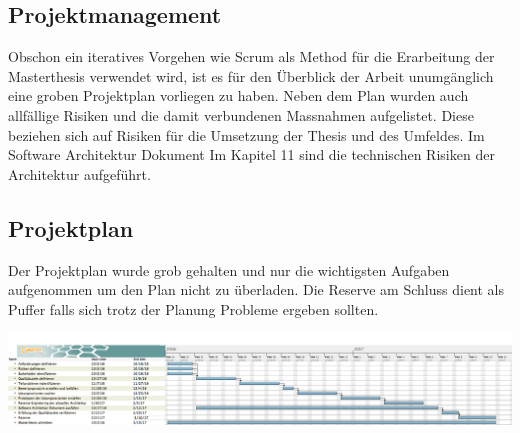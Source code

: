 \graphicspath{{./images/}}


\begin{landscape}
	
\chapter{Projektmanagement}

Obschon ein iteratives Vorgehen wie Scrum als Method für die Erarbeitung der Masterthesis verwendet wird, ist es für den Überblick der Arbeit unumgänglich eine groben Projektplan vorliegen zu haben. Neben dem Plan wurden auch allfällige Risiken und die damit verbundenen Massnahmen aufgelistet. Diese beziehen sich auf Risiken für die Umsetzung der Thesis und des Umfeldes. Im Software Architektur Dokument Im Kapitel 11 sind die technischen Risiken der Architektur aufgeführt.


\section{Projektplan}

Der Projektplan wurde grob gehalten und nur die wichtigsten Aufgaben aufgenommen um den Plan nicht zu überladen. Die Reserve am Schluss dient als Puffer falls sich trotz der Planung Probleme ergeben sollten.

\begin{center}
	\includegraphics[scale=0.37]{projectplan.png}
\end{center}
\newpage	


\end{landscape}
